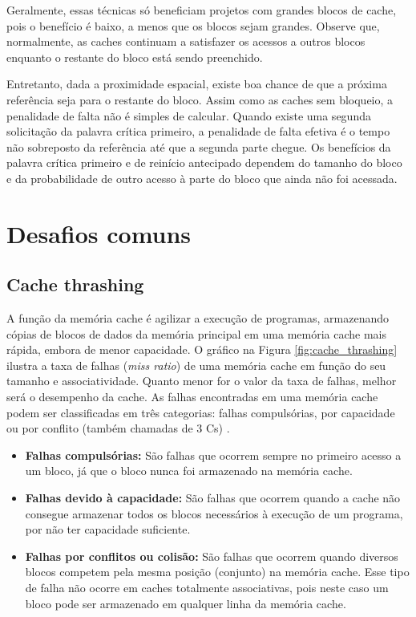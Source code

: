 Geralmente, essas técnicas só beneficiam projetos com grandes blocos de cache, pois o benefício é baixo, a menos que os blocos sejam grandes. Observe que, normalmente, as caches continuam a satisfazer os acessos a outros blocos enquanto o restante do bloco está sendo preenchido.

Entretanto, dada a proximidade espacial, existe boa chance de que a próxima referência seja para o restante do bloco. Assim como as caches sem bloqueio, a penalidade de falta não é simples de calcular. Quando existe uma segunda solicitação da palavra crítica primeiro, a penalidade de falta efetiva é o tempo não sobreposto da referência até que a segunda parte chegue. Os benefícios da palavra crítica primeiro e de reinício antecipado dependem do tamanho do bloco e da probabilidade de outro acesso à parte do bloco que ainda não foi acessada.

\section{Desafios comuns}
\subsection{Cache thrashing}
A função da memória cache é agilizar a execução de programas, armazenando cópias de blocos de dados da memória principal em uma memória cache mais rápida, embora de menor capacidade. O gráfico na Figura \ref{fig:cache_thrashing} ilustra a taxa de falhas (\textit{miss ratio}) de uma memória cache em função do seu tamanho e associatividade. Quanto menor for o valor da taxa de falhas, melhor será o desempenho da cache. As falhas encontradas em uma memória cache podem ser classificadas em três categorias: falhas compulsórias, por capacidade ou por conflito (também chamadas de 3 Cs) \cite{hennessy2017}.

\begin{itemize}
    \item \textbf{Falhas compulsórias:} São falhas que ocorrem sempre no primeiro acesso a um bloco, já que o bloco nunca foi armazenado na memória cache.
    \item \textbf{Falhas devido à capacidade:} São falhas que ocorrem quando a cache não consegue armazenar todos os blocos necessários à execução de um programa, por não ter capacidade suficiente.
    \item \textbf{Falhas por conflitos ou colisão:} São falhas que ocorrem quando diversos blocos competem pela mesma posição (conjunto) na memória cache. Esse tipo de falha não ocorre em caches totalmente associativas, pois neste caso um bloco pode ser armazenado em qualquer linha da memória cache.
\end{itemize}

